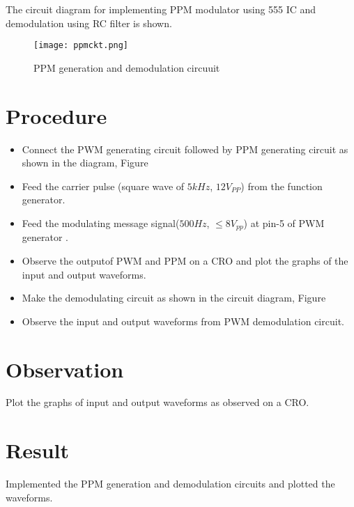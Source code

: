 The circuit diagram for implementing PPM modulator using 555 IC and demodulation using RC filter is shown.

\begin{sidewaysfigure}
\texttt{[image: ppmckt.png]}
\caption{PPM generation and demodulation circuuit}
\label{ppmckt}
\end{sidewaysfigure}




\section*{Procedure}
\begin{itemize}
\item
Connect the PWM generating circuit followed by PPM generating circuit  as shown in the diagram, Figure %
\item
Feed the carrier pulse (square wave of $5 kHz$, $12V_{PP}$) from the function generator. 
\item
Feed the modulating message signal($500 Hz$, $\le 8 V_{pp}$) at pin-5 of PWM generator .
\item
Observe the outputof PWM and PPM on a CRO and plot the graphs of the input and output waveforms.
\item
Make the demodulating circuit as shown in the circuit diagram, Figure %
\item
Observe the input and output waveforms from PWM demodulation circuit. 
\end{itemize}
\section*{Observation}
Plot the graphs of input and output waveforms as observed on a CRO.
\section*{Result}

Implemented the PPM generation and demodulation circuits and plotted the waveforms.